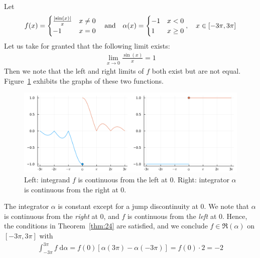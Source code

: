 \documentclass[thmcnt=section, 12pt]{my-elegantbook}
\begin{document}
\begin{example}
    Let
    \begin{align*}
        f(x) = \begin{cases}
                   \frac{\left\lvert \sin(x) \right\rvert}{x} & x \neq 0 \\
                   -1                      & x = 0
               \end{cases}
        \quad\text{and}\quad
        \alpha(x) = \begin{cases}
                        -1 & x < 0    \\
                        1  & x \geq 0
                    \end{cases},
        \quad x \in [-3\pi, 3\pi]
    \end{align*}
    Let us take for granted that the following limit exists:
    \begin{align*}
        \lim_{x \to 0} \frac{\sin (x)}{x} = 1
    \end{align*}
    Then we note that the left and right limits of $f$ both exist but are not equal. Figure~\ref{fig:10} exhibits the graphs of these two functions.

    \begin{figure}[ht]
        \centering
        \includegraphics[scale=0.2]{figures/graph-009.png}
        \caption{Left: integrand $f$ is continuous from the left at $0$. Right: integrator $\alpha$ is continuous from the right at $0$.}
        \label{fig:10}
    \end{figure}

    The integrator $\alpha$ is constant except for a jump discontinuity at $0$. We note that $\alpha$ is continuous from the \textit{right} at $0$, and $f$ is continuous from the \textit{left} at $0$. Hence, the conditions in Theorem~\ref{thm:24} are satisfied, and we conclude $f \in \mathfrak{R}(\alpha)$ on $[-3\pi, 3\pi]$ with
    \begin{align*}
        \int_{-3\pi}^{3\pi}f \; \mathrm{d}\alpha
        = f(0)[\alpha(3\pi) - \alpha(-3\pi)]
        = f(0) \cdot 2 = -2
    \end{align*}
    \label{eg:3}
\end{example}
\end{document}
